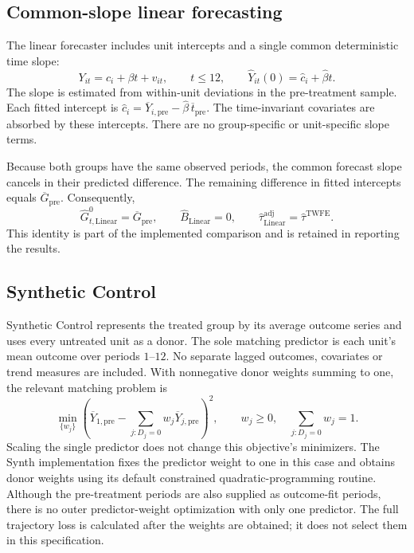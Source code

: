 \documentclass[11pt,a4paper]{article}
\begin{document}
\subsection{Common-slope linear forecasting}
The linear forecaster includes unit intercepts and a single common deterministic time slope:
\begin{equation}\label{eq:linear}
Y_{it}=c_i+\beta t+v_{it},\qquad t\leq12,
\qquad \widehat Y_{it}(0)=\widehat c_i+\widehat\beta t.
\end{equation}
The slope is estimated from within-unit deviations in the pre-treatment sample. Each fitted intercept is $\widehat c_i=\overline Y_{i,\mathrm{pre}}-\widehat\beta\,\overline t_{\mathrm{pre}}$. The time-invariant covariates are absorbed by these intercepts. There are no group-specific or unit-specific slope terms.

Because both groups have the same observed periods, the common forecast slope cancels in their predicted difference. The remaining difference in fitted intercepts equals $\overline G_{\mathrm{pre}}$. Consequently,
\begin{equation}\label{eq:linearzero}
\widehat G^0_{t,\mathrm{Linear}}=\overline G_{\mathrm{pre}},
\qquad \widehat B_{\mathrm{Linear}}=0,
\qquad \widehat\tau^{\mathrm{adj}}_{\mathrm{Linear}}=\widehat\tau^{\mathrm{TWFE}}.
\end{equation}
This identity is part of the implemented comparison and is retained in reporting the results.

\subsection{Synthetic Control}
Synthetic Control represents the treated group by its average outcome series and uses every untreated unit as a donor. The sole matching predictor is each unit's mean outcome over periods $1$--$12$. No separate lagged outcomes, covariates or trend measures are included. With nonnegative donor weights summing to one, the relevant matching problem is
\begin{equation}\label{eq:synthweights}
\min_{\{w_j\}}\left(\overline Y_{1,\mathrm{pre}}-\sum_{j:D_j=0}w_j\overline Y_{j,\mathrm{pre}}\right)^2,
\qquad w_j\geq0,\quad\sum_{j:D_j=0}w_j=1.
\end{equation}
Scaling the single predictor does not change this objective's minimizers. The Synth implementation fixes the predictor weight to one in this case and obtains donor weights using its default constrained quadratic-programming routine. Although the pre-treatment periods are also supplied as outcome-fit periods, there is no outer predictor-weight optimization with only one predictor. The full trajectory loss is calculated after the weights are obtained; it does not select them in this specification.
\end{document}
